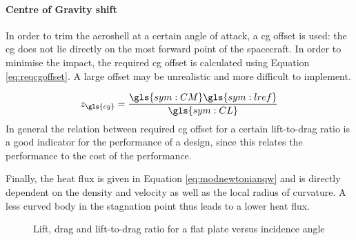 \paragraph{Centre of Gravity shift}
In order to trim the aeroshell at a certain angle of attack, a \gls{cg} offset is used: the \gls{cg} does not lie directly on the most forward point of the spacecraft. In order to minimise the impact, the required \gls{cg} offset is calculated using Equation \ref{eq:reqcgoffset}. A large offset may be unrealistic and more difficult to implement.

\begin{equation} \label{eq:reqcgoffset}
z_{\gls{cg}} = \frac{\gls{sym:CM}\gls{sym:lref}}{\gls{sym:CL}}
\end{equation}
In general the relation between required \gls{cg} offset for a certain lift-to-drag ratio is a good indicator for the performance of a design, since this relates the performance to the cost of the performance.

Finally, the heat flux is given in Equation \ref{eq:modnewtonianqw} and is directly dependent on the density and velocity as well as the local radius of curvature. A less curved body in the stagnation point thus leads to a lower heat flux.

\begin{figure}[h]
	\centering
	\setlength{} 
	\setlength{}
	
	\caption{Lift, drag and lift-to-drag ratio for a flat plate versus incidence angle}
	\label{fig:CLCD-incidence}
\end{figure}

